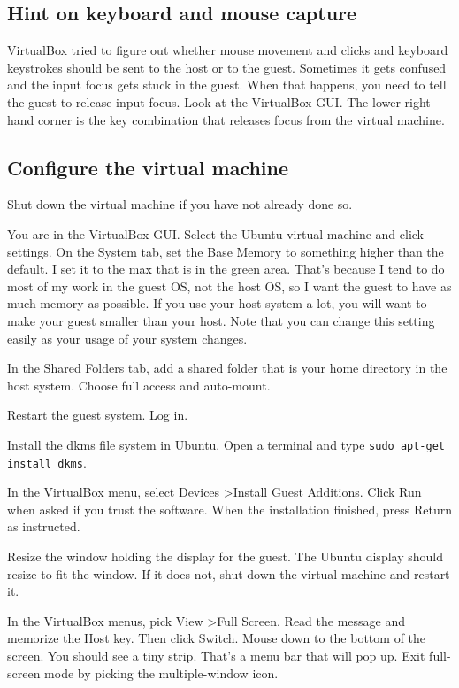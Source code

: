\documentclass{article}
\let\code\texttt %
\begin{document}
\subsection{Hint on keyboard and mouse capture}

VirtualBox tried to figure out whether mouse movement and clicks and
keyboard keystrokes should be sent to the host or to the guest.
Sometimes it gets confused and the input focus gets stuck in
the guest. When that happens, you need to tell the guest
to release input focus. Look at the VirtualBox GUI. The lower
right hand corner is the key combination that releases focus from the
virtual machine.

\subsection{Configure the virtual machine}

Shut down the virtual machine if you have not already done so.

You are in the VirtualBox GUI. Select the Ubuntu virtual machine and
click settings.  On the System tab, set the Base Memory to something
higher than the default. I set it to the max that is in the green area.
That's because I tend to do most of my work in the guest OS, not the
host OS, so I want the guest to have as much memory as possible. If you
use your host system a lot, you will want to make your guest smaller
than your host. Note that you can change this setting easily as your
usage of your system changes.

In the Shared Folders tab, add a shared folder that is your home
directory in the host system. Choose full access and auto-mount.

Restart the guest system. Log in.

Install the dkms file system in Ubuntu. Open a terminal and type
\code{sudo apt-get install dkms}.

In the VirtualBox menu, select Devices \textgreater Install Guest
Additions. Click Run when asked if you trust the software. When the
installation finished, press Return as instructed.

Resize the window holding the display for the guest. The Ubuntu display
should resize to fit the window. If it does not, shut down the virtual
machine and restart it. 

In the VirtualBox menus, pick View \textgreater Full Screen.  Read the
message and memorize the Host key. Then click Switch.  Mouse down to the
bottom of the screen. You should see a tiny strip.  That's a menu bar
that will pop up. Exit full-screen mode by picking the multiple-window
icon.
\end{document}
